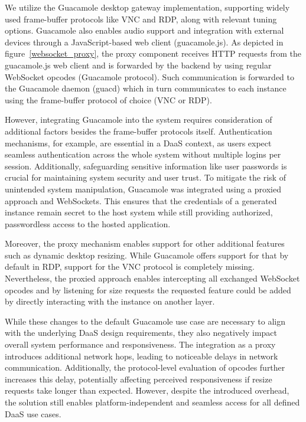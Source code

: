 \documentclass[runningheads]{llncs}
\begin{document}
We utilize the Guacamole desktop gateway implementation,
supporting widely used frame-buffer protocols like VNC and RDP,
along with relevant tuning options.
Guacamole also enables audio support and integration with external devices
through a JavaScript-based web client (guacamole.js).
As depicted in figure~\ref{websocket_proxy},
the proxy component receives HTTP requests from the guacamole.js web client
and is forwarded by the backend by using regular WebSocket opcodes (Guacamole protocol).
Such communication is forwarded to the Guacamole daemon (guacd)
which in turn communicates to each instance using the frame-buffer protocol of choice (VNC or RDP).

However, integrating Guacamole into the system
requires consideration of additional factors besides the frame-buffer protocols itself.
Authentication mechanisms, for example, are essential in a DaaS context,
as users expect seamless authentication across the whole system
without multiple logins per session.
Additionally, safeguarding sensitive information like user passwords is crucial
for maintaining system security and user trust.
To mitigate the risk of unintended system manipulation, Guacamole was integrated
using a proxied approach and WebSockets.
This ensures that the credentials of a generated instance remain secret to the host system
while still providing authorized, passwordless access to the hosted application.

Moreover, the proxy mechanism enables support for other additional features
such as dynamic desktop resizing.
While Guacamole offers support for that by default in RDP, support for the VNC protocol is completely missing.
Nevertheless, the proxied approach enables intercepting all exchanged WebSocket opcodes
and by listening for size requests
the requested feature could be added
by directly interacting with the instance on another layer.

While these changes to the default Guacamole use case are necessary to align
with the underlying DaaS design requirements,
they also negatively impact overall system performance and responsiveness.
The integration as a proxy introduces additional network hops,
leading to noticeable delays in network communication.
Additionally, the protocol-level evaluation of opcodes further increases this delay,
potentially affecting perceived responsiveness
if resize requests take longer than expected.
However, despite the introduced overhead,
the solution still enables platform-independent
and seamless access for all defined DaaS use cases.
\end{document}
